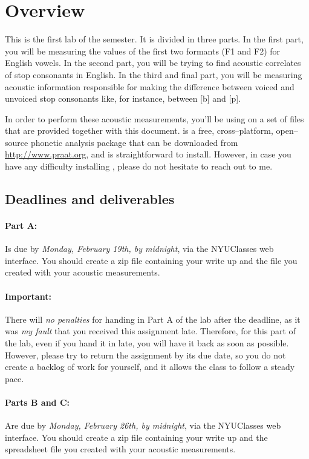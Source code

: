 \section{Overview}

This is the first lab of the semester. It is divided in three parts. In the first part, you will be measuring the values of the first two formants (F1 and F2) for English vowels. In the second part, you will be trying to find acoustic correlates of stop consonants in English. In the third and final part, you will be measuring acoustic information responsible for making the difference between voiced and unvoiced stop consonants like, for instance, between [b] and [p].

In order to perform these acoustic measurements, you'll be using \Praat{} on a set of files that are provided together with this document. \Praat{} is a free, cross--platform, open--source phonetic analysis package that can be downloaded from \href{http://www.praat.org}{http://www.praat.org}, and is straightforward to install. However, in case you have any difficulty installing \Praat{}, please do not hesitate to reach out to me.

\subsection{Deadlines and deliverables}

\paragraph{Part A:} Is due by \emph{Monday, February 19th, by midnight}, via the NYUClasses web interface. You should create a zip file containing your write up and the  file you created with your acoustic measurements.

\paragraph{Important:} There will \emph{no penalties} for handing in Part A of the lab after the deadline, as it was \emph{my fault} that you received this assignment late. Therefore, for this part of the lab, even if you hand it in late, you will have it back as soon as possible. However, please try to return the assignment by its due date, so you do not create a backlog of work for yourself, and it allows the class to follow a steady pace.

\paragraph{Parts B and C:} Are due by \emph{Monday, February 26th, by midnight}, via the NYUClasses web interface. You should create a zip file containing your write up and the spreadsheet file you created with your acoustic measurements.

